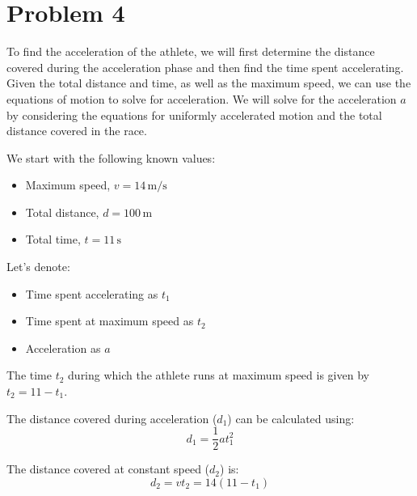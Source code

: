 \section{Problem 4}

\vspace{7mm}
To find the acceleration of the athlete, we will first determine the distance covered during the acceleration phase and then find the time spent accelerating. Given the total distance and time, as well as the maximum speed, we can use the equations of motion to solve for acceleration. We will solve for the acceleration \(a\) by considering the equations for uniformly accelerated motion and the total distance covered in the race.

\vspace{7mm}

\vspace{7mm}
We start with the following known values:
\begin{itemize}
    \item Maximum speed, \( v = 14 \, \text{m/s} \)
    \item Total distance, \( d = 100 \, \text{m} \)
    \item Total time, \( t = 11 \, \text{s} \)
\end{itemize}

Let's denote:
\begin{itemize}
    \item Time spent accelerating as \( t_1 \)
    \item Time spent at maximum speed as \( t_2 \)
    \item Acceleration as \( a \)
\end{itemize}

The time \( t_2 \) during which the athlete runs at maximum speed is given by \( t_2 = 11 - t_1 \). 

The distance covered during acceleration (\( d_1 \)) can be calculated using:
\[
d_1 = \frac{1}{2} a t_1^2
\]

The distance covered at constant speed (\( d_2 \)) is:
\[
d_2 = v t_2 = 14 (11 - t_1)
\]

